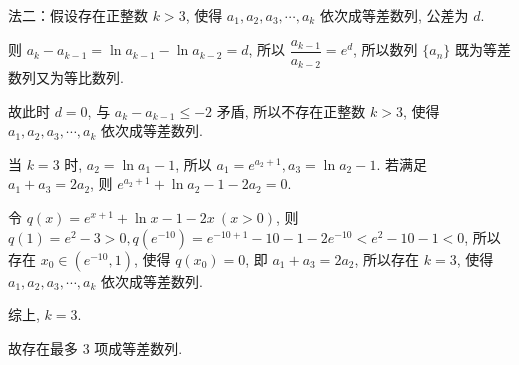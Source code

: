 \begin{solutions}
法二：假设存在正整数 $k > 3$, 使得 $a_1, a_2, a_3, \cdots, a_k$ 依次成等差数列, 公差为 $d$.

则 $a_k - a_{k-1} = \ln a_{k-1} - \ln a_{k-2} = d$, 所以 $\dfrac{a_{k-1}}{a_{k-2}} = e^d$, 所以数列 $\{a_n\}$ 既为等差数列又为等比数列.

故此时 $d = 0$, 与 $a_k - a_{k-1} \leqslant -2$ 矛盾, 所以不存在正整数 $k > 3$, 使得 $a_1, a_2, a_3, \cdots, a_k$ 依次成等差数列.

当 $k = 3$ 时, $a_2 = \ln a_1 - 1$, 所以 $a_1 = e^{a_2+1}, a_3 = \ln a_2 - 1$. 若满足 $a_1 + a_3 = 2a_2$, 则 $e^{a_2+1} + \ln a_2 - 1 - 2a_2 = 0$.

令 $q(x) = e^{x+1} + \ln x - 1 - 2x \ (x > 0)$, 则 $q(1) = e^2 - 3 > 0, q(e^{-10}) = e^{-10+1} - 10 - 1 - 2e^{-10} < e^2 - 10 - 1 < 0$, 所以存在 $x_0 \in (e^{-10}, 1)$, 使得 $q(x_0) = 0$, 即 $a_1 + a_3 = 2a_2$, 所以存在 $k = 3$, 使得 $a_1, a_2, a_3, \cdots, a_k$ 依次成等差数列.

综上, $k = 3$.

故存在最多 3 项成等差数列.
\end{solutions}